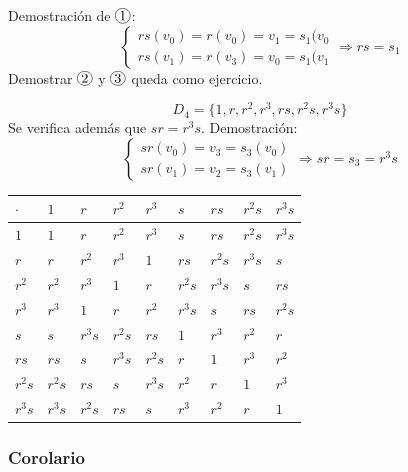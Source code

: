 \documentclass[11pt,a4paper]{article}
\newcommand*{\circled}[2][]{\tikz[baseline=(C.base)]{
	\node[inner sep=0pt] (C) {\vphantom{1g}#2};
	\node[draw, circle, inner sep=1pt, yshift=1pt]
		at (C.center) {\vphantom{1g}};}}
\begin{document}
Demostración de $\circled{1}$:
\begin{equation*}
\begin{cases}
rs(v_{0}) = r(v_{0}) = v_{1} = s_{1}(v_{0} \\
rs(v_{1}) = r(v_{3}) = v_{0} = s_{1}(v_{1}
\end{cases}
\Rightarrow rs = s_{1}
\end{equation*}
Demostrar $\circled{2}$ y $\circled{3}$ queda como ejercicio.

$$D_{4} = \{1, r, r^{2}, r^{3}, rs, r^{2}s, r^{3}s \}$$
Se verifica además que $sr = r^{3}s$. Demostración:
\begin{equation*}
\begin{cases}
sr(v_{0}) = v_{3} = s_{3}(v_{0}) \\
sr(v_{1}) = v_{2} = s_{3}(v_{1})
\end{cases}
\Rightarrow sr = s_{3} = r^{3}s
\end{equation*}

\begin{table}[h!]
\begin{tabular}{l|llll|llll}
$\cdot$	& $1$			& $r$			& $r^{2}$		& $r^{3}$		& $s$			& $rs$			& $r^{2}s$	& $r^{3}s$	\\
\hline
$1$			& $1$			& $r$			& $r^{2}$		& $r^{3}$		& $s$			& $rs$			& $r^{2}s$	& $r^{3}s$	\\
$r$			& $r$			& $r^{2}$		& $r^{3}$		& $1$			& $rs$			& $r^{2}s$	& $r^{3}s$	& $s$			\\
$r^{2}$		& $r^{2}$		& $r^{3}$		& $1$			& $r$			& $r^{2}s$	& $r^{3}s$	& $s$			& $rs$			\\
$r^{3}$		& $r^{3}$		& $1$			& $r$			& $r^{2}$		& $r^{3}s$	& $s$			& $rs$			& $r^{2}s$	\\
\hline
$s$			& $s$			& $r^{3}s$	& $r^{2}s$	& $rs$			& $1$			& $r^{3}$		& $r^{2}$		& $r$			\\
$rs$			& $rs$			& $s$			& $r^{3}s$	& $r^{2}s$	& $r$			& $1$			& $r^{3}$		& $r^{2}$		\\
$r^{2}s$	& $r^{2}s$	& $rs$			& $s$			& $r^{3}s$	& $r^{2}$		& $r$			& $1$			& $r^{3}$		\\
$r^{3}s$	& $r^{3}s$	& $r^{2}s$	& $rs$			& $s$			& $r^{3}$		& $r^{2}$		& $r$			& $1$
\end{tabular}
\end{table}


\subsubsection*{Corolario}
\end{document}
